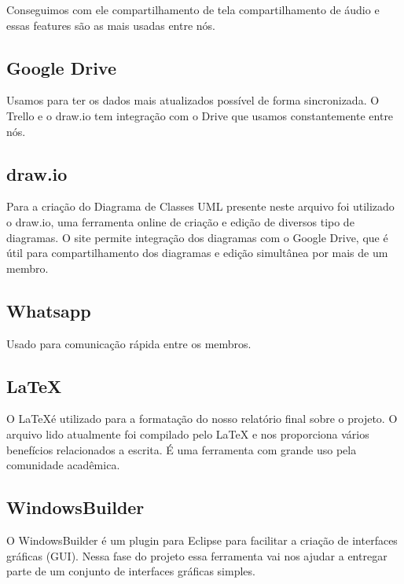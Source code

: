 \documentclass[a4paper,11pt,fleqn]{article}
\begin{document}
Conseguimos com ele compartilhamento de tela compartilhamento de áudio e essas features são as mais usadas entre
  nós.

\subsection{Google Drive}
\label{ss:google-drive}

Usamos para ter os dados mais atualizados possível de forma sincronizada. O Trello e o draw.io tem integração com o Drive que
  usamos constantemente entre nós.

\subsection{draw.io}
\label{ss:draw}

Para a criação do Diagrama de Classes UML presente neste arquivo foi utilizado o draw.io, uma ferramenta online de criação e edição de diversos tipo de diagramas.
 O site permite integração dos diagramas com o Google Drive, que é útil para compartilhamento dos diagramas e edição simultânea por mais de um membro.


\subsection{Whatsapp}
\label{ss:whatsapp}

Usado para comunicação rápida entre os membros.

\subsection{LaTeX}
\label{ss:latex}

O \LaTeX é utilizado para a formatação do nosso relatório final sobre o projeto. O arquivo lido atualmente foi compilado pelo LaTeX e
  nos proporciona vários benefícios relacionados a escrita. É uma ferramenta com grande uso pela comunidade acadêmica.

\subsection{WindowsBuilder}
\label{ss:windows-builder}

O WindowsBuilder é um plugin para Eclipse para facilitar a criação de interfaces gráficas (GUI). Nessa fase do projeto essa
  ferramenta vai nos ajudar a entregar parte de um conjunto de interfaces gráficas simples. 
\end{document}
